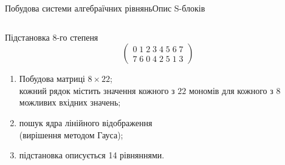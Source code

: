 \documentclass[10pt, ucs]{beamer}
\begin{document}
\begin{frame}{Побудова системи алгебраїчних рівнянь}{Опис S-блоків}
    \begin{columns}
        \begin{column}{0.5\textwidth}
            \begin{block}{Підстановка 8-го степеня}
                \begin{equation}
                    \nonumber
                    \left(
                    \begin{array}{ll}
                        0\; 1\; 2\; 3\; 4\; 5\; 6\; 7 \\
                        7\; 6\; 0\; 4\; 2\; 5\; 1\; 3 
                    \end{array} \right)
                \end{equation}
            \end{block}
            \begin{block}{}
                \begin{enumerate}
                    \item Побудова матриці $8 \times 22$; \\
                        {\small
                        кожний рядок містить значення кожного з $22$ мономів
                        для кожного з $8$ можливих вхідних значень;}
                    \item пошук ядра лінійного відображення \\
                        {\small(вирішення методом Гауса);} 
                    \item підстановка описується 14 рівняннями.
                \end{enumerate}
            \end{block}

        \end{column}%


\end{columns}
\end{frame}
\end{document}
